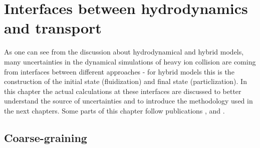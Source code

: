 \chapter{Interfaces between hydrodynamics and transport} \label{ch:interfaces}

As one can see from the discussion about hydrodynamical and hybrid models, many
uncertainties in the dynamical simulations of heavy ion collision are coming from
interfaces between different approaches - for hybrid models this is the construction of
the initial state (fluidization) and final state (particlization). In this chapter the
actual calculations at these interfaces are discussed to better understand the source
of uncertainties and to introduce the methodology used in the next chapters.
Some parts of this chapter follow publications \cite{Oliinychenko:2014tqa},
\cite{Oliinychenko:2015lva} and \cite{Oliinychenko:2016vkg}.

\section{Coarse-graining} \label{sec:coarse_graining}

